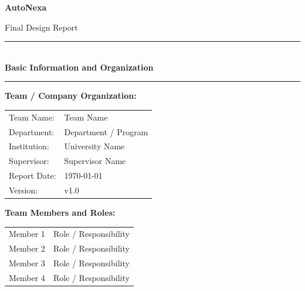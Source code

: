 \documentclass[12pt,a4paper]{report}
\newcommand{\projectname}{AutoNexa}
\newcommand{\reporttitle}{Final Design Report}
\newcommand{\teamname}{Team Name}
\newcommand{\department}{Department / Program}
\newcommand{\university}{University Name}
\newcommand{\supervisor}{Supervisor Name}
\newcommand{\reportdate}{\today}
\begin{document}
\begin{titlepage}
  \centering
  \vspace*{1.5cm}

  {\Huge \textbf{\projectname} \par}
  \vspace{0.5cm}
  {\LARGE \reporttitle \par}
  \vspace{1.2cm}

  \noindent\rule{\textwidth}{1.2pt}\\[0.4cm]
  {\large \textbf{Basic Information and Organization}}\\[0.4cm]
  \noindent\rule{\textwidth}{1.2pt}

  \vfill

  \begin{flushleft}
    \textbf{Team / Company Organization:} \\[0.2cm]
    \begin{tabular}{ll}
      Team Name: & \teamname \\
      Department: & \department \\
      Institution: & \university \\
      Supervisor: & \supervisor \\
      Report Date: & \reportdate \\
      Version: & v1.0
    \end{tabular}
  \end{flushleft}

  \vspace{0.8cm}
  \begin{flushleft}
    \textbf{Team Members and Roles:}\\
    \begin{tabular}{p{4cm}p{10cm}}
      Member 1 & Role / Responsibility \\
      Member 2 & Role / Responsibility \\
      Member 3 & Role / Responsibility \\
      Member 4 & Role / Responsibility \\
    \end{tabular}
  \end{flushleft}

  \vfill
\end{titlepage}

\tableofcontents
\clearpage
\listoffigures
\clearpage
\listoftables
\clearpage
{}
\end{document}
